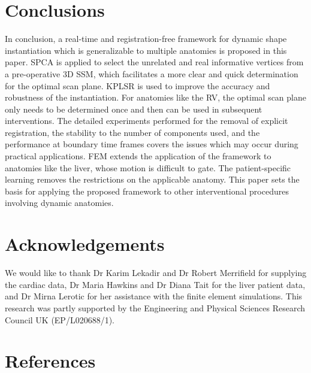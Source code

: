 \documentclass[review]{elsarticle}
\begin{document}
\section{Conclusions}
In conclusion, a real-time and registration-free framework for dynamic shape instantiation which is generalizable to multiple anatomies is proposed in this paper. SPCA is applied to select the unrelated and real informative vertices from a pre-operative 3D SSM, which facilitates a more clear and quick determination for the optimal scan plane. KPLSR is used to improve the accuracy and robustness of the instantiation. For anatomies like the RV, the optimal scan plane only needs to be determined once and then can be used in subsequent interventions. The detailed experiments performed for the removal of explicit registration, the stability to the number of components used, and the performance at boundary time frames covers the issues which may occur during practical applications. FEM extends the application of the framework to anatomies like the liver, whose motion is difficult to gate. The patient-specific learning removes the restrictions on the applicable anatomy. This paper sets the basis for applying the proposed framework to other interventional procedures involving dynamic anatomies.

\section{Acknowledgements}
We would like to thank Dr Karim Lekadir and Dr Robert Merrifield for supplying the cardiac data, Dr Maria Hawkins and Dr Diana Tait for the liver patient data, and Dr Mirna Lerotic for her assistance with the finite element simulations. This research was partly supported by the Engineering and Physical Sciences Research Council UK (EP/L020688/1).

\section*{References}

\end{document}
